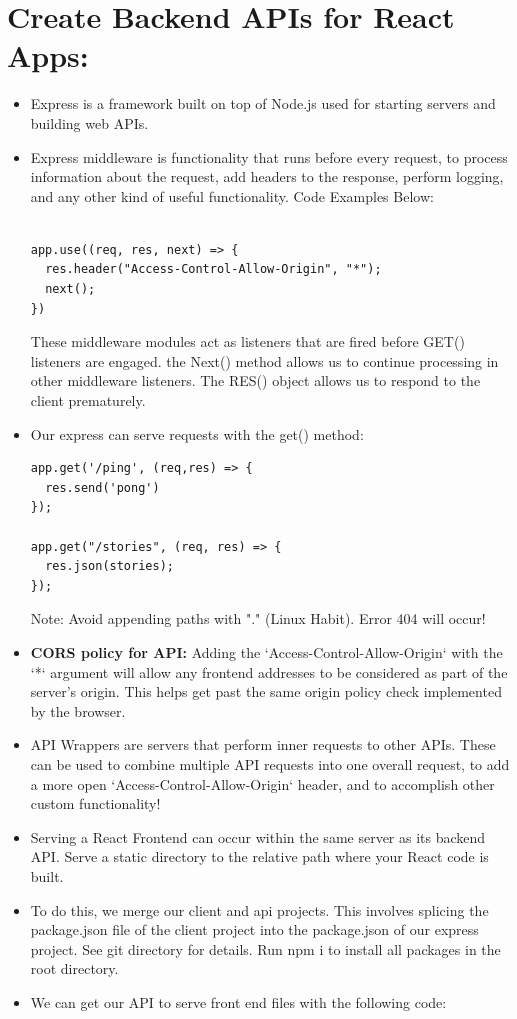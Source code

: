 \documentclass[8pt,a4paper]{extarticle}
\begin{document}
\section*{Create Backend APIs for React Apps:}
\begin{itemize}
\item Express is a framework built on top of Node.js used for starting servers and building web APIs.
\item Express middleware is functionality that runs before every request, to process information about the request, add headers to the response, perform logging, and any other kind of useful functionality. Code Examples Below:

\begin{verbatim}

app.use((req, res, next) => {
  res.header("Access-Control-Allow-Origin", "*");
  next();
})

\end{verbatim}

These middleware modules act as listeners that are fired before GET() listeners are engaged. the Next() method allows us to continue processing in other middleware listeners. The RES() object allows us to respond to the client prematurely.
\item Our express can serve requests with the get() method:

\begin{verbatim}
app.get('/ping', (req,res) => {
  res.send('pong')
});

app.get("/stories", (req, res) => {
  res.json(stories);
});
\end{verbatim}

Note: Avoid appending paths with "." (Linux Habit). Error 404 will occur!


\item \textbf{CORS policy for API:} Adding the `Access-Control-Allow-Origin` with the `*` argument will allow any frontend addresses to be considered as part of the server’s origin. This helps get past the same origin policy check implemented by the browser.
\item API Wrappers are servers that perform inner requests to other APIs. These can be used to combine multiple API requests into one overall request, to add a more open `Access-Control-Allow-Origin` header, and to accomplish other custom functionality!
\item Serving a React Frontend can occur within the same server as its backend API. Serve a static directory to the relative path where your React code is built.
\item To do this, we merge our client and api projects. This involves splicing the package.json file of the client project into the package.json of our express project. See git directory for details. Run npm i to install all packages in the root directory.
\item We can get our API to serve front end files with the following code:


\end{itemize}
\end{document}
